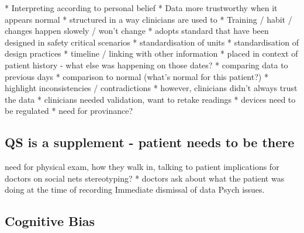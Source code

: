 \documentclass{sigchi}
\begin{document}

* Interpreting according to personal belief
* Data more trustworthy when it appears normal
* structured in a way clinicians are used to
  * Training / habit / changes happen slowely / won't change
  * adopts standard that have been designed in safety critical scenarios
    * standardisation of units
    * standardisation of design practices
* timeline / linking with other information
  * placed in context of patient history - what else was happening on those dates?
  * comparing data to previous days
  * comparison to normal (what's normal for this patient?)
  * highlight inconsistencies / contradictions
* however, clinicians didn't always trust the data
  * clinicians needed validation, want to retake readings
  * devices need to be regulated
  * need for provinance?


\subsection{QS is a supplement - patient needs to be there}






need for physical exam, how they walk in, talking to patient
implications for doctors on social nets
stereotyping?
* doctors ask about what the patient was doing at the time of recording
Immediate dismissal of data
Psych issues.




\subsection{Cognitive Bias}
\end{document}

